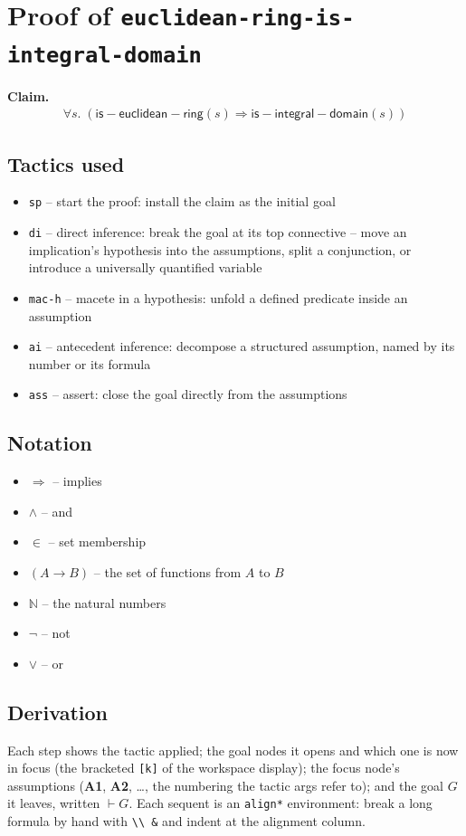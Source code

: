 \documentclass[11pt]{article}
\begin{document}
\section*{Proof of \texttt{euclidean-ring-is-integral-domain}}
\textbf{Claim.}
\begin{align*}
  \forall s.\; (\mathsf{is{-}euclidean{-}ring}(s) \Rightarrow \mathsf{is{-}integral{-}domain}(s))
\end{align*}
\bigskip

\subsection*{Tactics used}
\begin{itemize}
\item \texttt{sp} -- start the proof: install the claim as the initial goal
\item \texttt{di} -- direct inference: break the goal at its top connective -- move an implication's hypothesis into the assumptions, split a conjunction, or introduce a universally quantified variable
\item \texttt{mac-h} -- macete in a hypothesis: unfold a defined predicate inside an assumption
\item \texttt{ai} -- antecedent inference: decompose a structured assumption, named by its number or its formula
\item \texttt{ass} -- assert: close the goal directly from the assumptions
\end{itemize}

\subsection*{Notation}
\begin{itemize}
\item $\Rightarrow$ -- implies
\item $\wedge$ -- and
\item $\in$ -- set membership
\item $(A \to B)$ -- the set of functions from $A$ to $B$
\item $\mathbb{N}$ -- the natural numbers
\item $\neg$ -- not
\item $\vee$ -- or
\end{itemize}

\subsection*{Derivation}
Each step shows the tactic applied; the goal nodes it opens and which one is now in focus (the bracketed \texttt{[k]} of the workspace display); the focus node's assumptions (\textbf{A1}, \textbf{A2}, \dots{}, the numbering the tactic args refer to); and the goal $G$ it leaves, written $\vdash G$.  Each sequent is an \texttt{align*} environment: break a long formula by hand with \texttt{\textbackslash\textbackslash\ \&} and indent at the alignment column.
\end{document}
